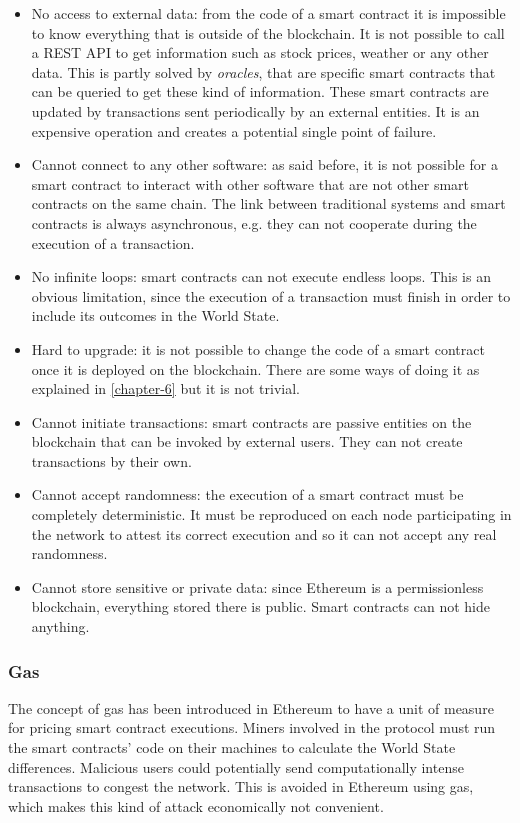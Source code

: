 \begin{itemize}
    \item No access to external data: from the code of a smart contract it is impossible to know everything that is outside of the blockchain. It is not possible to call a REST API to get information such as stock prices, weather or any other data. This is partly solved by \textit{oracles}, that are specific smart contracts that can be queried to get these kind of information. These smart contracts are updated by transactions sent periodically by an external entities. It is an expensive operation and creates a potential single point of failure.
    \item Cannot connect to any other software: as said before, it is not possible for a smart contract to interact with other software that are not other smart contracts on the same chain. The link between traditional systems and smart contracts is always asynchronous, e.g. they can not cooperate during the execution of a transaction.
    \item No infinite loops: smart contracts can not execute endless loops. This is an obvious limitation, since the execution of a transaction must finish in order to include its outcomes in the World State.
    \item Hard to upgrade: it is not possible to change the code of a smart contract once it is deployed on the blockchain. There are some ways of doing it as explained in \cref{chapter-6} but it is not trivial. 
    \item Cannot initiate transactions: smart contracts are passive entities on the blockchain that can be invoked by external users. They can not create transactions by their own.
    \item Cannot accept randomness: the execution of a smart contract must be completely deterministic. It must be reproduced on each node participating in the network to attest its correct execution and so it can not accept any real randomness.
    \item  Cannot store sensitive or private data: since Ethereum is a permissionless blockchain, everything stored there is public. Smart contracts can not hide anything. 
\end{itemize}

\subsubsection{Gas}

The concept of gas has been introduced in Ethereum to have a unit of measure for pricing smart contract executions. Miners involved in the protocol must run the smart contracts' code on their machines to calculate the World State differences. Malicious users could potentially send computationally intense transactions to congest the network. This is avoided in Ethereum using gas, which makes this kind of attack economically not convenient.

